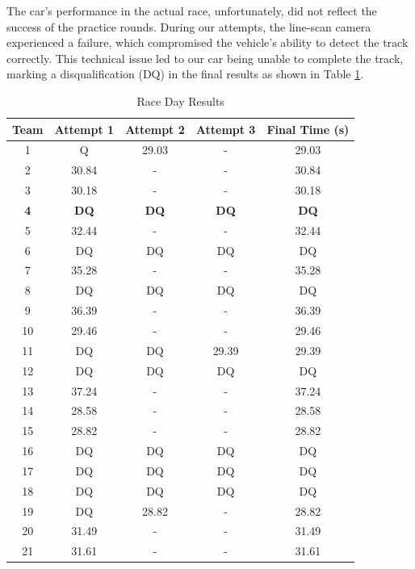 \documentclass[conference]{IEEEtran}
\begin{document}
The car's performance in the actual race, unfortunately, did not reflect the success of the practice rounds. During our attempts, the line-scan camera experienced a failure, which compromised the vehicle's ability to detect the track correctly. This technical issue led to our car being unable to complete the track, marking a disqualification (DQ) in the final results as shown in Table \ref{tab:raceResults}.

\begin{table}[htbp]
	\caption{Race Day Results}
	\begin{center}
	\begin{tabular}{|c|c|c|c|c|}
		\hline
		\textbf{Team} & \textbf{Attempt 1} & \textbf{Attempt 2} & \textbf{Attempt 3} & \textbf{Final Time (s)} \\
		\hline
		1 & Q & 29.03 & - & 29.03 \\
		2 & 30.84 & - & - & 30.84 \\
		3 & 30.18 & - & - & 30.18 \\
		\textbf{4} & \textbf{DQ} & \textbf{DQ} & \textbf{DQ} & \textbf{DQ} \\
		5 & 32.44 & - & - & 32.44 \\
		6 & DQ & DQ & DQ & DQ \\
		7 & 35.28 & - & - & 35.28 \\
		8 & DQ & DQ & DQ & DQ \\
		9 & 36.39 & - & - & 36.39 \\
		10 & 29.46 & - & - & 29.46 \\
		11 & DQ & DQ & 29.39 & 29.39 \\
		12 & DQ & DQ & DQ & DQ \\
		13 & 37.24 & - & - & 37.24 \\
		14 & 28.58 & - & - & 28.58 \\
		15 & 28.82 & - & - & 28.82 \\
		16 & DQ & DQ & DQ & DQ \\
		17 & DQ & DQ & DQ & DQ \\
		18 & DQ & DQ & DQ & DQ \\
		19 & DQ & 28.82 & - & 28.82 \\
		20 & 31.49 & - & - & 31.49 \\
		21 & 31.61 & - & - & 31.61 \\

		\hline
	\end{tabular}
	\label{tab:raceResults}
	\end{center}
\end{table}
\end{document}
